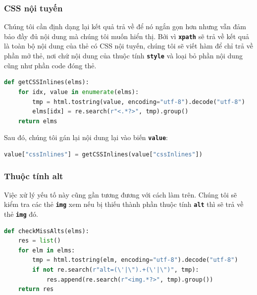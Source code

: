 \subsubsection{CSS nội tuyến}
Chúng tôi cần định dạng lại kết quả trả về để nó ngắn gọn hơn nhưng vẫn đảm bảo đầy đủ nội dung mà chúng tôi muốn hiển thị. Bởi vì \textbf{\texttt{xpath}} sẽ trả về kết quả là toàn bộ nội dung của thẻ có CSS nội tuyến, chúng tôi sẽ viết hàm để chỉ trả về phần mở thẻ, nơi chứ nội dung của thuộc tính \textbf{\texttt{style}} và loại bỏ phần nội dung cũng như phần code đóng thẻ.
\begin{lstlisting}[language=Python]
def getCSSInlines(elms):
    for idx, value in enumerate(elms):
        tmp = html.tostring(value, encoding="utf-8").decode("utf-8")
        elms[idx] = re.search(r"<.*?>", tmp).group()
    return elms
\end{lstlisting}
\par
Sau đó, chúng tôi gán lại nội dung lại vào biến \textbf{\texttt{value}}:
\begin{lstlisting}[language=Python]
value["cssInlines"] = getCSSInlines(value["cssInlines"])
\end{lstlisting}
\subsubsection{Thuộc tính alt}
Việc xử lý yếu tố này cũng gần tương đương với cách làm trên. Chúng tôi sẽ kiểm tra các thẻ \textbf{\texttt{img}} xem nếu bị thiếu thành phần thuộc tính \textbf{\texttt{alt}} thì sẽ trả về thẻ \textbf{\texttt{img}} đó.
\begin{lstlisting}[language=Python]
def checkMissAlts(elms):
    res = list()
    for elm in elms:
        tmp = html.tostring(elm, encoding="utf-8").decode("utf-8")
        if not re.search(r"alt=(\'|\").+(\'|\")", tmp):
            res.append(re.search(r"<img.*?>", tmp).group())
    return res
\end{lstlisting}
